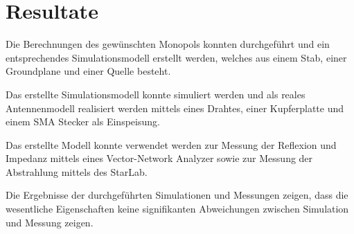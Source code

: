 \section{Resultate}


Die Berechnungen des gewünschten Monopols konnten durchgeführt und
ein entsprechendes Simulationsmodell erstellt werden, welches aus
einem Stab, einer Groundplane und einer Quelle besteht.

Das erstellte Simulationsmodell konnte simuliert werden und als
reales Antennenmodell realisiert werden mittels eines Drahtes,
einer Kupferplatte und einem SMA Stecker als Einspeisung.

Das erstellte Modell konnte verwendet werden zur Messung der
Reflexion und Impedanz mittels eines Vector-Network Analyzer
sowie zur Messung der Abstrahlung mittels des StarLab.

Die Ergebnisse der durchgeführten Simulationen und Messungen
zeigen, dass die wesentliche Eigenschaften keine signifikanten
Abweichungen zwischen Simulation und Messung zeigen. 
